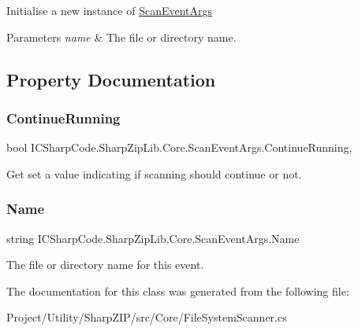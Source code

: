 Initialise a new instance of \hyperlink{class_i_c_sharp_code_1_1_sharp_zip_lib_1_1_core_1_1_scan_event_args}{Scan\+Event\+Args} 


\begin{DoxyParams}{Parameters}
{\em name} & The file or directory name.\\
\hline
\end{DoxyParams}


\subsection{Property Documentation}
\mbox{\label{class_i_c_sharp_code_1_1_sharp_zip_lib_1_1_core_1_1_scan_event_args_af809f91a43356acb99ba57cfeafa6aea}} 
\subsubsection{\texorpdfstring{Continue\+Running}{ContinueRunning}}
{\footnotesize\ttfamily bool I\+C\+Sharp\+Code.\+Sharp\+Zip\+Lib.\+Core.\+Scan\+Event\+Args.\+Continue\+Running\hspace{0.3cm}{\ttfamily [get]}, {\ttfamily [set]}}



Get set a value indicating if scanning should continue or not. 

\mbox{\label{class_i_c_sharp_code_1_1_sharp_zip_lib_1_1_core_1_1_scan_event_args_ab164cd9634a636803875d14d280cf27d}} 
\subsubsection{\texorpdfstring{Name}{Name}}
{\footnotesize\ttfamily string I\+C\+Sharp\+Code.\+Sharp\+Zip\+Lib.\+Core.\+Scan\+Event\+Args.\+Name\hspace{0.3cm}{\ttfamily [get]}}



The file or directory name for this event. 



The documentation for this class was generated from the following file\+:\begin{DoxyCompactItemize}
\item 
Project/\+Utility/\+Sharp\+Z\+I\+P/src/\+Core/File\+System\+Scanner.\+cs\end{DoxyCompactItemize}
